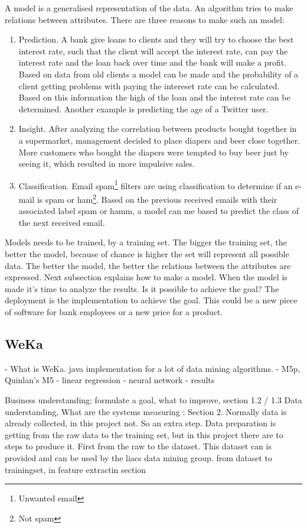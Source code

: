 	A model is a generalised representation of the data. An algorithm tries to make relations between attributes. There are three reasons to make such an model:
	\begin{enumerate}
		\item Prediction. A bank give loans to clients and they will try to choose the best interest rate, such that the client will accept the interest rate, can pay the interest rate and the loan back over time and the bank will make a profit. Based on data from old clients a model can be made and the probability of a client getting problems with paying the intereset rate can be calculated. Based on this information the high of the loan and the interest rate can be determined.\cite{credit} Another example is predicting the age of a Twitter user\cite{tweetgenie}.		
		\item Insight. After analyzing the correlation between products bought together in a supermarket, management decided to place diapers and beer close together. More customers who bought the diapers were tempted to buy beer just by seeing it, which resulted in more impulsive sales\cite{beer}.
		\item Classification. Email spam\footnote{Unwanted email} filters are using classification to determine if an e-mail is spam or ham\footnote{Not spam}. Based on the previous received emails with their associated label spam or hamm, a model can me based to predict the class of the next received email. 
	\end{enumerate}
	Models needs to be trained, by a training set. The bigger the training set, the better the model, because of chance is higher the set will represent all possible data. The better the model, the better the relations between the attributes are expressed. Next subsection explains how to make a model. When the model is made it's time to analyze the results. Is it possible to achieve the goal? The deployment is the implementation to achieve the goal. This could be a new piece of software for bank employees or a new price for a product. 

	\subsection{WeKa}
	- What is WeKa. java implementation for a lot of data mining algorithms.
	- M5p, Quinlan's M5
	- linear regression
	- neural network
	- results 

	\iffalse

	Business understanding: formulate a goal, what to improve, section 1.2 / 1.3
	Data understanding, What are the systems measuring : Section 2.
	Normally data is already collected, in this project not. So an extra step.
	Data preparation is getting from the raw data to the training set, but in this project there are to steps to produce it.
	First from the raw to the dataset. This dataset can is provided and can be used by the liacs data mining group.
	from dataset to trainingset, in feature extractin section



